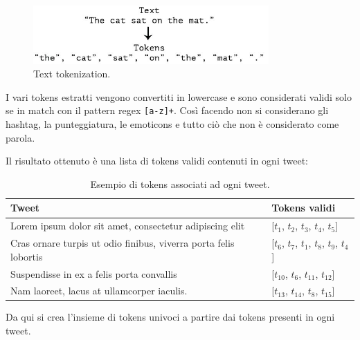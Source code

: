 \documentclass[oneside]{book}
\begin{document}
\begin{figure}[!h]
	\centering
	\includegraphics[width=9cm]{assets/text-to-tokens.jpg}
	\caption{Text tokenization.}
	\label{fig:tokenization}
\end{figure}


\pagebreak

I vari tokens estratti vengono convertiti in lowercase e sono considerati validi solo se in match con il pattern regex \texttt{[a-z]+}. Così facendo non si considerano gli hashtag, la punteggiatura, le emoticons e tutto ciò che non è considerato come parola.

Il risultato ottenuto è una lista di tokens validi contenuti in ogni tweet:

\begin{table}[h!]
	\centering
	\begin{tabular}[t]{l|l}
		\hline
		\textbf{Tweet} & \textbf{Tokens validi}\\
		\hline
		Lorem ipsum dolor sit amet, consectetur adipiscing elit				& [$t_1$, $t_2$, $t_3$, $t_4$, $t_5$] \\
		Cras ornare turpis ut odio finibus, viverra porta felis lobortis 	& [$t_6$, $t_7$, $t_1$, $t_8$, $t_9$, $t_4$] \\
		Suspendisse in ex a felis porta convallis							& [$t_{10}$, $t_6$, $t_{11}$, $t_{12}$] \\
		Nam laoreet, lacus at ullamcorper iaculis.							& [$t_{13}$, $t_{14}$, $t_8$, $t_{15}$]\\
		
		\hline
	\end{tabular}
	\caption{Esempio di tokens associati ad ogni tweet.}
\end{table}
\noindent
Da qui si crea l'insieme di tokens univoci a partire dai tokens presenti in ogni tweet.
\end{document}

